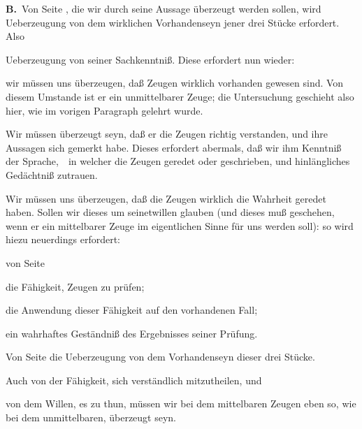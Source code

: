 \vabst \textbf{B.}~Von Seite , die wir durch seine Aussage überzeugt werden sollen, wird Ueberzeugung von dem wirklichen Vorhandenseyn jener drei Stücke erfordert. Also
\begin{aufza}
\item Ueberzeugung von seiner Sachkenntniß. Diese erfordert nun wieder:
\begin{aufzb}
\item wir müssen uns überzeugen, daß Zeugen wirklich vorhanden gewesen sind. Von diesem Umstande ist er ein unmittelbarer Zeuge; die Untersuchung geschieht also hier, wie im vorigen Paragraph gelehrt wurde.
\item Wir müssen überzeugt seyn, daß er die Zeugen richtig verstanden, und ihre Aussagen sich gemerkt habe. Dieses erfordert abermals, daß wir ihm Kenntniß der Sprache,~\ in welcher die Zeugen geredet oder geschrieben, und hinlängliches Gedächtniß zutrauen.
\item Wir müssen uns überzeugen, daß die Zeugen wirklich die Wahrheit geredet haben. Sollen wir dieses um seinetwillen glauben (und dieses muß geschehen, wenn er ein mittelbarer Zeuge im eigentlichen Sinne für uns werden soll): so wird hiezu neuerdings erfordert:
\end{aufzb}
\begin{aufzc}
\item von  Seite
\begin{aufzb}[a.]
\item die Fähigkeit, Zeugen zu prüfen;
\item die Anwendung dieser Fähigkeit auf den vorhandenen Fall;
\item ein wahrhaftes Geständniß des Ergebnisses seiner Prüfung.
\end{aufzb}
\item Von  Seite die Ueberzeugung von dem Vorhandenseyn dieser drei Stücke.
\end{aufzc}
\item Auch von der Fähigkeit, sich verständlich mitzutheilen, und
\item von dem Willen, es zu thun, müssen wir bei dem mittelbaren Zeugen eben so, wie bei dem unmittelbaren, überzeugt seyn.
\end{aufza}\par

